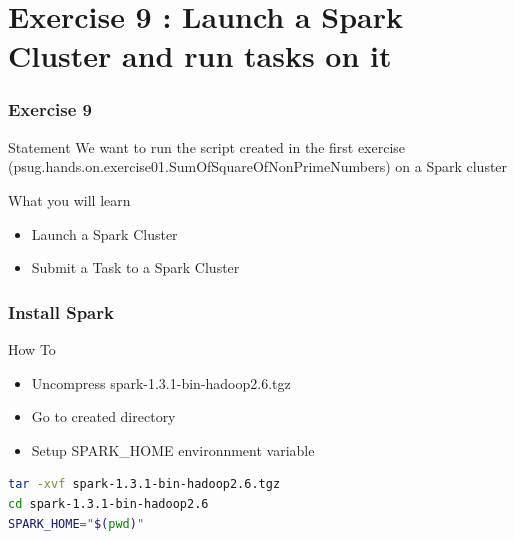 \documentclass[slidetop,9pt,utf8]{beamer}
\begin{document}
\begin{CJK}{UTF8}{gbsn}
\begin{frame}[fragile]
\end{frame}

%
%
%
%

\section{Exercise 9 : Launch a Spark Cluster and run tasks on it}

\begin{frame}
  \frametitle{Exercise 9}

  \begin{block}{Statement}
    We want to run the script created in the first exercise (psug.hands.on.exercise01.SumOfSquareOfNonPrimeNumbers) on a 
Spark cluster
  \end{block}

  \begin{block}{What you will learn}
    \begin{itemize}
      \item Launch a Spark Cluster
      \item Submit a Task to a Spark Cluster
    \end{itemize}
  \end{block}

\end{frame}

\begin{frame}[fragile]

  \frametitle{Install Spark}

  \begin{block}{How To}
    \begin{itemize}
      \item Uncompress spark-1.3.1-bin-hadoop2.6.tgz
      \item Go to created directory
      \item Setup SPARK\_HOME environnment variable
    \end{itemize}
  \end{block}

  \begin{lstlisting}[language=bash, style=terminal-large]
tar -xvf spark-1.3.1-bin-hadoop2.6.tgz
cd spark-1.3.1-bin-hadoop2.6
SPARK_HOME="$(pwd)" 
  \end{lstlisting} 

\end{frame}

\begin{frame}[fragile]


\end{frame}
\end{CJK}
\end{document}
